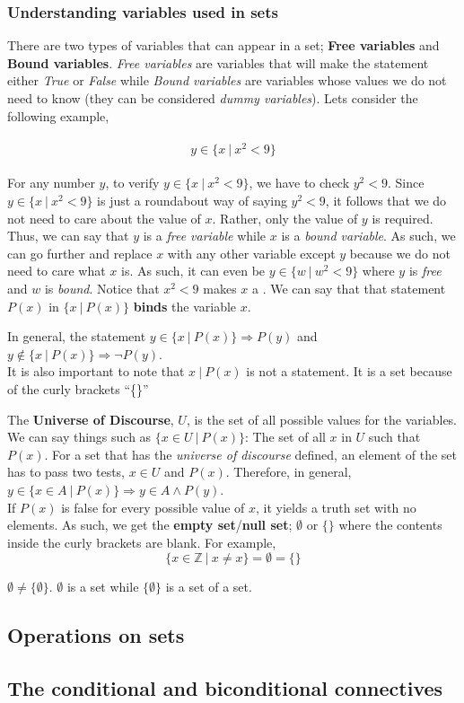 \documentclass[../setup.tex]{subfiles}
\begin{document}
\subsubsection{Understanding variables used in sets}
There are two types of variables that can appear in a set; \textbf{Free variables} and \textbf{Bound variables}. \textit{Free variables} are variables that will make the statement either \textit{True} or \textit{False} while \textit{Bound variables} are variables whose values we do not need to know (they can be considered \textit{dummy variables}). Lets consider the following example, \\
\\
 \[ y \in \{x \ | \ x^2 < 9\} \] 
\\
For any number $y$, to verify $y \in \{x \ | \ x^2 < 9\}$, we have to check $y^2 < 9$. Since $y \in \{x \ | \ x^2 < 9\}$ is just a roundabout way of saying $y^2 < 9$, it follows that we do not need to care about the value of $x$. Rather, only the value of $y$ is required. Thus, we can say that $y$ is a \textit{free variable} while $x$ is a \textit{bound variable}. As such, we can go further and replace $x$ with any other variable except $y$ because we do not need to care what $x$ is. As such, it can even be $y \in \{w\ | \ w^2 < 9\}$ where $y$ is \textit{free} and $w$ is \textit{bound}. Notice that $x^2 < 9$ makes $x$ a . We can say that that statement $P(x)$ in $\{x \ | \ P(x)\}$ \textbf{binds} the variable $x$. \\


\begin{remark}
In general, the statement $y \in \{x\ |\ P(x)\} \Rightarrow P(y)$ and $y \notin \{x\ |\ P(x)\} \Rightarrow \lnot P(y)$. \\
It is also important to note that ${x\ |\ P(x)}$ is not a statement. It is a set because of the curly brackets ``\{\}''
\end{remark}
\clearpage

The \textbf{Universe of Discourse}, $U$, is the set of all possible values for the variables. We can say things such as $\{x \in U\ |\ P(x)\}$: The set of all $x$ in $U$ such that $P(x)$. For a set that has the \textit{universe of discourse} defined, an element of the set has to pass two tests, $x \in U$ and $P(x)$. Therefore, in general, $y \in \{x\in A\ |\ P(x)\} \Rightarrow y\in A \land P(y)$. \\
If $P(x)$ is false for every possible value of $x$, it yields a truth set with no elements. As such, we get the \textbf{empty set}/\textbf{null set}; $\emptyset$ or $\{\}$ where the contents inside the curly brackets are blank. For example, \\
\[\{x\in\mathbb{Z} \ |\ x \neq x\} = \emptyset = \{\}\]

\begin{remark}
$\emptyset \neq \{\emptyset\}$. $\emptyset$ is a set while $\{\emptyset\}$ is a set of a set.
\end{remark}
\subsection{Operations on sets}
\subsection{The conditional and biconditional connectives}
\end{document}
